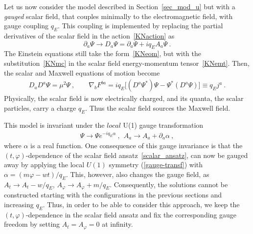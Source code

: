 Let us now consider the model described in Section~\ref{sec_mod_u} but with a \textit{gauged} scalar field, 
that couples minimally to the electromagnetic field, with gauge coupling $q_E$. 
This coupling is implemented by replacing the partial derivatives of the scalar field in the action~\eqref{KNaction} as
\begin{equation}
\partial_a \Psi \longrightarrow D_a\Psi=\partial_a \Psi + iq_E A_a \Psi \ .
\label{KNmc}
\end{equation}
The Einstein equations still take the form~\eqref{KNeom}, but with the substitution~\eqref{KNmc} 
in the scalar field energy-momentum tensor~\eqref{KNemt}. Then, the scalar and Maxwell equations of motion become
\begin{eqnarray}
\label{field-eqs}
D_{a}D^{a}\Psi=\mu^2 \Psi\ , \qquad 
\nabla_{b}F^{ba}=
iq_E \big [ (D^{a}\Psi^*) \Psi-\Psi^*(D^a \Psi) \big ] 
\equiv q_E j^a  \ .
\end{eqnarray}  
Physically, the scalar field is now electrically charged, 
and its quanta, the scalar particles, carry a charge $q_E$.
Thus the scalar field sources the Maxwell field.

This model is invariant under the $local$ U(1) gauge transformation 
\begin{eqnarray}
\label{gauge-transf}
\Psi \to \Psi e^{-i q_E \alpha}\ ,~~A_a\to A_a+\partial_a \alpha \ ,
\end{eqnarray}
where $\alpha$ is a real function. One consequence of this gauge invariance is that the $(t, \varphi)$-dependence of the scalar field ansatz~\eqref{scalar_ansatz}, 
can now be gauged away by applying the local $U(1)$ symmetry
(\ref{gauge-transf})
with $\alpha =  (m\varphi -w t)/q_E$.  This, however, also changes the gauge field, as $A_t\to A_t-w/q_E$,
$A_\varphi \to A_\varphi+m/q_E$. 
%
Consequently, the solutions cannot be constructed starting with the configurations in the
previous sections and increasing $q_E$.
%
Thus, in order
to be able to consider this approach, we  keep the $(t,\varphi)$-dependence in 
the scalar field ansatz and fix the corresponding gauge freedom by setting $A_t = A_\varphi = 0$ at infinity.

